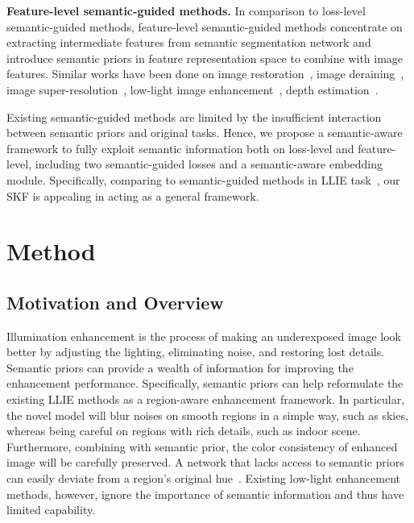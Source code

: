 \documentclass[10pt,twocolumn,letterpaper]{article}
\begin{document}
\textbf{Feature-level semantic-guided methods.} In comparison to loss-level semantic-guided methods, feature-level semantic-guided methods concentrate on extracting intermediate features from semantic segmentation network and introduce semantic priors in feature representation space to combine with image features. Similar works have been done on image restoration~\cite{li2020dfdnet}, image deraining~\cite{li2022close}, image super-resolution~\cite{wang2018sft}, low-light image enhancement~\cite{fan2020integrating}, depth estimation~\cite{guizilini2019semanticdepth3, jung2021semanticdepth1}.

Existing semantic-guided methods are limited by the insufficient interaction between semantic priors and original tasks. Hence, we propose a semantic-aware framework to fully exploit semantic information both on loss-level and feature-level, including two semantic-guided losses and a semantic-aware embedding module. Specifically, comparing to semantic-guided methods in LLIE task~\cite{fan2020integrating,zheng2022semanticzeroLLIE,liang2022SCLLLE}, our SKF is appealing in acting as a general framework. 

\vspace{-0.1cm}
\section{Method}
\vspace{-0.1cm}


\subsection{Motivation and Overview}
\vspace{-0.1cm}
Illumination enhancement is the process of making an underexposed image look better by adjusting the lighting, eliminating noise, and restoring lost details. Semantic priors can provide a wealth of information for improving the enhancement performance. Specifically, semantic priors can help reformulate the existing LLIE methods as a region-aware enhancement framework. In particular, the novel model will blur noises on smooth regions in a simple way, such as skies, whereas being careful on regions with rich details, such as indoor scene. Furthermore, combining with semantic prior, the color consistency of enhanced image will be carefully preserved. A network that lacks access to semantic priors can easily deviate from a region's original hue~\cite{li2021lliesurvey}. Existing low-light enhancement methods, however, ignore the importance of semantic information and thus have limited capability.
\end{document}
